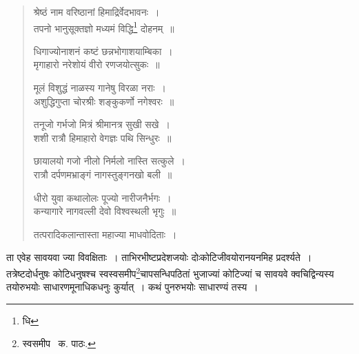 \documentclass[11pt, openany]{book}
\begin{document}
\begin{quote}
{\qt श्रेष्ठं नाम वरिष्ठानां हिमाद्रिर्वेदभावनः~।\\
तपनो भानुसूक्तज्ञो मध्यमं विद्धि\renewcommand{\thefootnote}{२}\footnote{धि} दोहनम्~॥

धिगाज्योनाशनं कष्टं छन्नभोगाशयाम्बिका~।\\
मृगाहारो नरेशोयं वीरो रणजयोत्सुकः~॥

मूलं विशुद्धं नाळस्य गानेषु विरळा नराः~।\\
अशुद्धिगुप्ता चोरश्रीः शङ्कुकर्णो नगेश्वरः~॥

तनूजो गर्भजो मित्रं श्रीमानत्र सुखी सखे~।\\
शशी रात्रौ हिमाहारो वेगज्ञः पथि सिन्धुरः~॥

छायालयो गजो नीलो निर्मलो नास्ति सत्कुले~।\\
रात्रौ दर्पणमभ्राङ्गं नागस्तुङ्गनखो बली~॥

धीरो युवा कथालोलः पूज्यो नारीजनैर्भगः~।\\
कन्यागारे नागवल्ली देवो विश्वस्थली भृगुः~॥

तत्परादिकलान्तास्ता महाज्या माधवोदिताः~।}
\end{quote}

\noindent ता एवेह सावयवा ज्या विवक्षिताः~। ताभिरभीष्टप्रदेशजयोः दोःकोटिजीवयोरानयनमिह प्रदर्श्यते~। तत्रेष्टदोर्धनुषः कोटिधनुषश्च
स्वस्वसमीप\renewcommand{\thefootnote}{३}\footnote{स्वसमीप \textendash\ क. पाठः.}चापसन्धिपठितां भुजाज्यां कोटिज्यां च सावयवे क्वचिद्विन्यस्य तयोरुभयोः साधारणमूनाधिकधनुः कुर्यात्~। कथं पुनरुभयोः साधारण्यं तस्य~। 

\newpage
\end{document}
